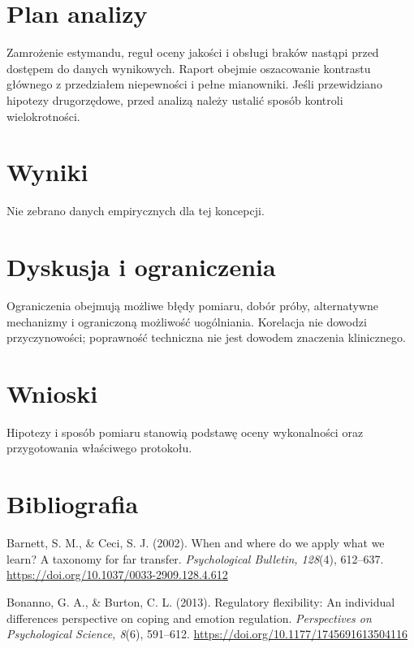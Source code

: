 \documentclass[11pt,a4paper]{article}
\begin{document}
\section{Plan analizy}

Zamrożenie estymandu, reguł oceny jakości i obsługi braków nastąpi przed dostępem do danych wynikowych. Raport obejmie oszacowanie kontrastu głównego z przedziałem niepewności i pełne mianowniki. Jeśli przewidziano hipotezy drugorzędowe, przed analizą należy ustalić sposób kontroli wielokrotności.

\section{Wyniki}

Nie zebrano danych empirycznych dla tej koncepcji.

\section{Dyskusja i ograniczenia}

Ograniczenia obejmują możliwe błędy pomiaru, dobór próby, alternatywne mechanizmy i ograniczoną możliwość uogólniania. Korelacja nie dowodzi przyczynowości; poprawność techniczna nie jest dowodem znaczenia klinicznego.

\section{Wnioski}

Hipotezy i sposób pomiaru stanowią podstawę oceny wykonalności oraz przygotowania właściwego protokołu.

\section*{Bibliografia}

{\setlength{\parindent}{0pt}
\setlength{\parskip}{5pt}
\hangindent=1.27cm
Barnett, S. M., \& Ceci, S. J. (2002). When and where do we apply what we learn? A taxonomy for far transfer. \textit{Psychological Bulletin, 128}(4), 612--637. \url{https://doi.org/10.1037/0033-2909.128.4.612}\par
\hangindent=1.27cm
Bonanno, G. A., \& Burton, C. L. (2013). Regulatory flexibility: An individual differences perspective on coping and emotion regulation. \textit{Perspectives on Psychological Science, 8}(6), 591--612. \url{https://doi.org/10.1177/1745691613504116}\par
}
\end{document}
